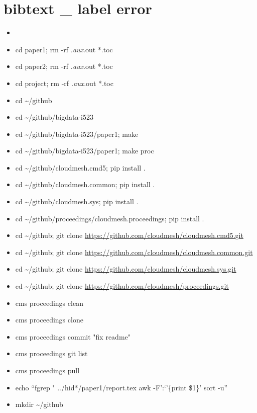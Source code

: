 \section{bibtext \_ label error}\label{bibtext-_-label-error}

\begin{itemize}
\item
\item
  cd paper1; rm -rf \emph{.aux}.out *.toc
\item
  cd paper2; rm -rf \emph{.aux}.out *.toc
\item
  cd project; rm -rf \emph{.aux}.out *.toc
\item
  cd \textasciitilde{}/github
\item
  cd \textasciitilde{}/github/bigdata-i523
\item
  cd \textasciitilde{}/github/bigdata-i523/paper1; make
\item
  cd \textasciitilde{}/github/bigdata-i523/paper1; make proc
\item
  cd \textasciitilde{}/github/cloudmesh.cmd5; pip install .
\item
  cd \textasciitilde{}/github/cloudmesh.common; pip install .
\item
  cd \textasciitilde{}/github/cloudmesh.sys; pip install .
\item
  cd \textasciitilde{}/github/proceedings/cloudmesh.proceedings; pip
  install .
\item
  cd \textasciitilde{}/github; git clone
  \url{https://github.com/cloudmesh/cloudmesh.cmd5.git}
\item
  cd \textasciitilde{}/github; git clone
  \url{https://github.com/cloudmesh/cloudmesh.common.git}
\item
  cd \textasciitilde{}/github; git clone
  \url{https://github.com/cloudmesh/cloudmesh.sys.git}
\item
  cd \textasciitilde{}/github; git clone
  \url{https://github.com/cloudmesh/proceedings.git}
\item
  cms proceedings clean
\item
  cms proceedings clone
\item
  cms proceedings commit "fix readme"
\item
  cms proceedings git list
\item
  cms proceedings pull
\item
  echo ``fgrep " ../hid*/paper1/report.tex \textbar{} awk -F':`'\{print
  \$1\}' \textbar{} sort -u''
\item
  mkdir \textasciitilde{}/github

\end{itemize}
